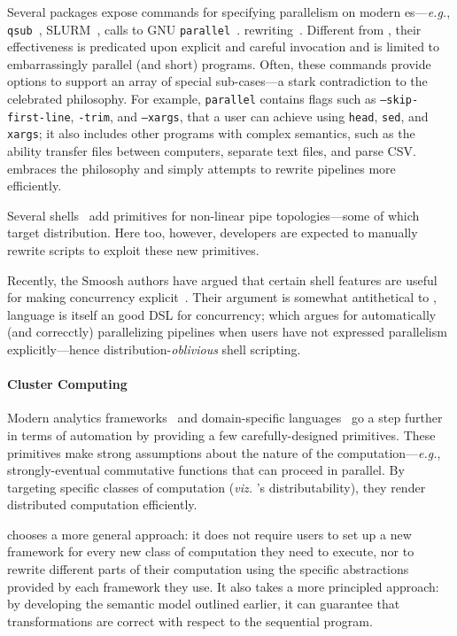\documentclass[letterpaper,twocolumn,10pt]{article}
\newcommand{\eg}{{\em e.g.}, }
\newcommand{\ttt}[1]{\texttt{\small #1}}
\begin{document}
Several packages expose commands for specifying parallelism on modern
\unix{}es---\eg \ttt{qsub}~\cite{gentzsch2001sun},
\textsc{SLURM}~\cite{yoo2003slurm}, calls to \textsc{GNU}
\ttt{parallel}~\cite{Tange2011a}. %
rewriting~\cite{mapreduce:08, ciel:11, spark:12}.  Different from
\sys, their effectiveness is predicated upon explicit and careful
invocation and is limited to embarrassingly parallel (and short)
programs.  Often, these commands provide options to support an array
of special sub-cases---a stark contradiction to the celebrated \unix
philosophy.  For example, \ttt{parallel} contains flags such as
\ttt{--skip-first-line}, \ttt{-trim}, and \ttt{--xargs}, that a \unix
user can achieve using \ttt{head}, \ttt{sed}, and \ttt{xargs}; it also
includes other programs with complex semantics, such as the ability
transfer files between computers, separate text files, and parse CSV.
\sys embraces the \unix philosophy and simply attempts to rewrite
pipelines more efficiently.

Several shells~\cite{duff1990rc, mcdonald1988support, dagsh:17} add
primitives for non-linear pipe topologies---some of which target
distribution.  Here too, however, developers are expected to manually
rewrite scripts to exploit these new primitives.

Recently, the Smoosh authors have argued that certain shell features
are useful for making concurrency explicit~\cite{smoosh:18}.  Their
argument is somewhat antithetical to \sys, %
language is itself an good DSL for concurrency; which argues for
automatically (and correcctly) parallelizing pipelines when users have
not expressed parallelism explicitly---hence
distribution-\emph{oblivious} shell scripting.


\paragraph{Cluster Computing}
Modern analytics frameworks~\cite{mapreduce:08, ciel:11, spark:12,
  naiad:13} and domain-specific languages~\cite{alvaro2011consistency,
  distal:13, meiklejohn2015lasp} go a step further in terms of
automation by providing a few carefully-designed primitives.  These
primitives make strong assumptions about the nature of the
computation---\eg strongly-eventual commutative functions that can
proceed in parallel.  By targeting specific classes of computation
(\emph{viz.} \sys's distributability), they render distributed
computation efficiently.

\sys chooses a more general approach: it does not require users to set
up a new framework for every new class of computation they need to
execute, nor to rewrite different parts of their computation using the
specific abstractions provided by each framework they use.  It also
takes a more principled approach: by developing the semantic model
outlined earlier, it can guarantee that transformations are correct
with respect to the sequential program.
\end{document}

